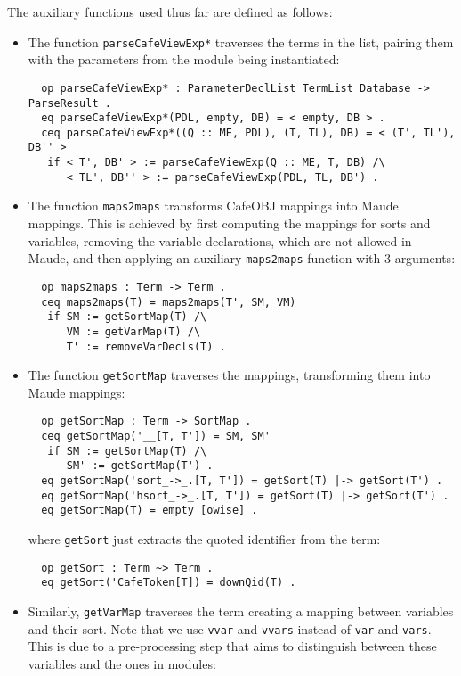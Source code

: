 The auxiliary functions used thus far are defined as follows:
\begin{itemize}
\item
The function \verb"parseCafeViewExp*" traverses the terms in the list,
pairing them with the parameters from the module being instantiated:

{\codesize
\begin{verbatim}
  op parseCafeViewExp* : ParameterDeclList TermList Database -> ParseResult .
  eq parseCafeViewExp*(PDL, empty, DB) = < empty, DB > .
  ceq parseCafeViewExp*((Q :: ME, PDL), (T, TL), DB) = < (T', TL'), DB'' >
   if < T', DB' > := parseCafeViewExp(Q :: ME, T, DB) /\
      < TL', DB'' > := parseCafeViewExp(PDL, TL, DB') .
\end{verbatim}
}

\item
The function \verb"maps2maps" transforms CafeOBJ mappings into Maude mappings.
This is achieved by first computing the mappings for sorts and variables,
removing the variable declarations, which are not allowed in Maude, and
then applying an auxiliary \verb"maps2maps" function with $3$ arguments:

{\codesize
\begin{verbatim}
  op maps2maps : Term -> Term .
  ceq maps2maps(T) = maps2maps(T', SM, VM)
   if SM := getSortMap(T) /\
      VM := getVarMap(T) /\
      T' := removeVarDecls(T) .
\end{verbatim}
}

\item
The function \verb"getSortMap" traverses the mappings, transforming them into
Maude mappings:

{\codesize
\begin{verbatim}
  op getSortMap : Term -> SortMap .
  ceq getSortMap('__[T, T']) = SM, SM'
   if SM := getSortMap(T) /\
      SM' := getSortMap(T') .
  eq getSortMap('sort_->_.[T, T']) = getSort(T) |-> getSort(T') .
  eq getSortMap('hsort_->_.[T, T']) = getSort(T) |-> getSort(T') .
  eq getSortMap(T) = empty [owise] .
\end{verbatim}
}

\noindent
where \verb"getSort" just extracts the quoted identifier from the term:

{\codesize
\begin{verbatim}
  op getSort : Term ~> Term .
  eq getSort('CafeToken[T]) = downQid(T) .
\end{verbatim}
}

\item
Similarly, \verb"getVarMap" traverses the term creating a mapping between variables
and their sort.
%
Note that we use \texttt{vvar} and \texttt{vvars} instead of \texttt{var} and
\texttt{vars}. This is due to a pre-processing step that aims to distinguish
between these variables and the ones in modules:


\end{itemize}
